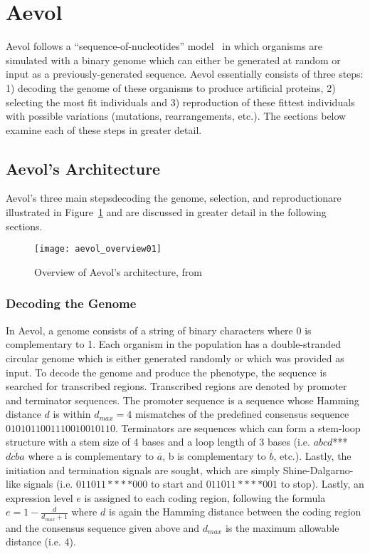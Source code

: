 \section{Aevol}
Aevol follows a ``sequence-of-nucleotides'' model~\cite{Batut.2013} in which organisms are simulated with a binary genome which can either be generated at random or input as a previously-generated sequence. Aevol essentially consists of three steps: 1) decoding the genome of these organisms to produce artificial proteins, 2) selecting the most fit individuals and 3) reproduction of these fittest individuals with possible variations (mutations, rearrangements, etc.). The sections below examine each of these steps in greater detail.

\subsection{Aevol's Architecture}
Aevol's three main steps\textemdash decoding the genome, selection, and reproduction\textemdash are illustrated in Figure~\ref{fig:aevol_overview01} and are discussed in greater detail in the following sections. 

\begin{figure}[H]
	\texttt{[image: aevol\_overview01]}
	\centering
	\caption[Overview of Aevol's architecture.]{Overview of Aevol's architecture, from \cite{Batut.2013}}
	\label{fig:aevol_overview01}
\end{figure}
\subsubsection{Decoding the Genome}\label{subsec:aevol_decoding}
In Aevol, a genome consists of a string of binary characters where 0 is complementary to 1. Each organism in the population has a double-stranded circular genome which is either generated randomly or which was provided as input. To decode the genome and produce the phenotype, the sequence is searched for transcribed regions. Transcribed regions are denoted by promoter and terminator sequences. The promoter sequence is a sequence whose Hamming distance $d$ is within $d_{max} = 4$ mismatches of the predefined consensus sequence $0101011001110010010110$. Terminators are sequences which can form a stem-loop structure with a stem size of 4 bases and a loop length of 3 bases (i.e. $abcd$***$\overline{dcba}$ where a is complementary to $\overline{a}$, b is complementary to $\overline{b}$, etc.). Lastly, the initiation and termination signals are sought, which are simply Shine-Dalgarno-like signals (i.e. $011011****000$ to start and $011011****001$ to stop). Lastly, an expression level $e$ is assigned to each coding region, following the formula $e = 1 - \frac{d}{d_{max} + 1}$ where $d$ is again the Hamming distance between the coding region and the consensus sequence given above and $d_{max}$ is the maximum allowable distance (i.e. 4). 

